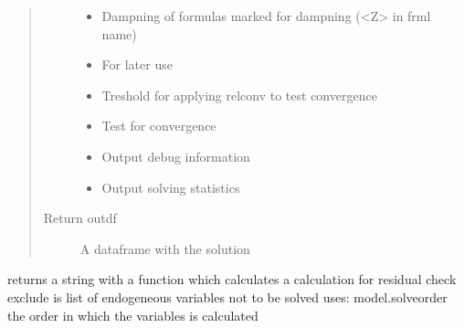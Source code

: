 \documentclass[letterpaper,10pt,english]{sphinxmanual}
\begin{document}
\begin{fulllineitems}
\begin{fulllineitems}
\begin{quote}
\begin{description}
\begin{itemize}
\item {} 
\sphinxAtStartPar
{} \textendash{} Dampning of formulas marked for dampning (\textless{}Z\textgreater{} in frml name)

\item {} 
\sphinxAtStartPar
{} \textendash{} For later use

\item {} 
\sphinxAtStartPar
{} \textendash{} Treshold for applying relconv to test convergence

\item {} 
\sphinxAtStartPar
{} \textendash{} Test for convergence

\item {} 
\sphinxAtStartPar
{} \textendash{} Output debug information

\item {} 
\sphinxAtStartPar
{} \textendash{} Output solving statistics

\end{itemize}

\item[{Return outdf}] \leavevmode
\sphinxAtStartPar
A dataframe with the solution

\end{description}\end{quote}

\end{fulllineitems}


\begin{fulllineitems}
\label{\detokenize{index:modelclass.BaseModel.outres}}
\pysigstartsignatures
{}
\pysigstopsignatures
\sphinxAtStartPar
returns a string with a function which calculates a
calculation for residual check
exclude is list of endogeneous variables not to be solved
uses:
model.solveorder the order in which the variables is calculated

\end{fulllineitems}


\end{fulllineitems}
\end{document}
